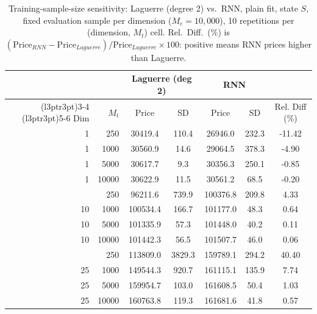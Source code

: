 \begin{table}

\caption{\label{tab:training_sample_sensitivity}Training-sample-size sensitivity: Laguerre (degree 2) vs.\ RNN, plain fit, state $S$, fixed evaluation sample per dimension ($M_e=10{,}000$), 10 repetitions per (dimension, $M_t$) cell. Rel.\ Diff.\ (\%) is $(\text{Price}_{RNN} - \text{Price}_{Laguerre})/\text{Price}_{Laguerre} \times 100$: positive means RNN prices higher than Laguerre.}
\footnotesize
\setlength{\tabcolsep}{4pt}
\centering
\begin{tabular}[t]{rrccccc}
\toprule
\multicolumn{2}{c}{ } & \multicolumn{2}{c}{Laguerre (deg 2)} & \multicolumn{2}{c}{RNN} & \multicolumn{1}{c}{ } \\
\cmidrule(l{3pt}r{3pt}){3-4} \cmidrule(l{3pt}r{3pt}){5-6}
Dim & $M_t$ & Price & SD & Price & SD & Rel. Diff (\%)\\
\midrule
1 & 250 & 30419.4 & 110.4 & 26946.0 & 232.3 & -11.42\\
1 & 1000 & 30560.9 & 14.6 & 29064.5 & 378.3 & -4.90\\
1 & 5000 & 30617.7 & 9.3 & 30356.3 & 250.1 & -0.85\\
1 & 10000 & 30622.9 & 11.5 & 30561.2 & 68.5 & -0.20\\
\addlinespace
10 & 250 & 96211.6 & 739.9 & 100376.8 & 209.8 & 4.33\\
10 & 1000 & 100534.4 & 166.7 & 101177.0 & 48.3 & 0.64\\
10 & 5000 & 101335.9 & 57.3 & 101448.0 & 40.2 & 0.11\\
10 & 10000 & 101442.3 & 56.5 & 101507.7 & 46.0 & 0.06\\
\addlinespace
25 & 250 & 113809.0 & 3829.3 & 159789.1 & 294.2 & 40.40\\
25 & 1000 & 149544.3 & 920.7 & 161115.1 & 135.9 & 7.74\\
25 & 5000 & 159954.7 & 103.0 & 161608.5 & 50.4 & 1.03\\
25 & 10000 & 160763.8 & 119.3 & 161681.6 & 41.8 & 0.57\\
\bottomrule
\end{tabular}
\end{table}
